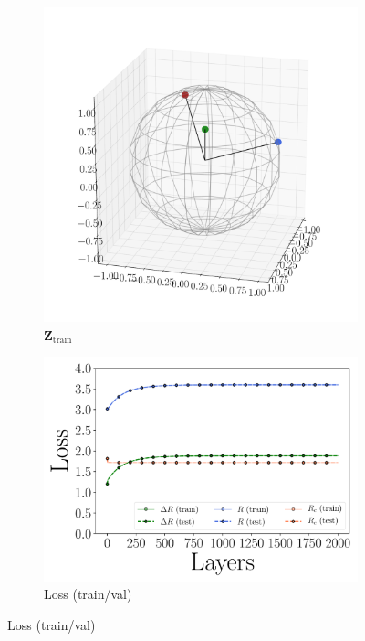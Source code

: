 \documentclass[../../book-main.tex]{subfiles}
\begin{document}
\begin{example}
\begin{figure}[t]
\begin{subfigure}[t]{0.32\textwidth}
        \includegraphics[width=\textwidth]{figs_chap4/scatter3d-Z_train.pdf}\vspace{-0.1in}
        \caption{$\bm{Z}_{\text{train}}$}
    \end{subfigure}
    \hfill
    \begin{subfigure}[t]{0.32\textwidth}
        \centering 
        \includegraphics[width=\textwidth]{figs_chap4/scatter3d-loss-traintest.pdf}\vspace{-0.1in}
        \caption{Loss (train/val)}

\end{subfigure}
\end{figure}
\end{example}
\end{document}
